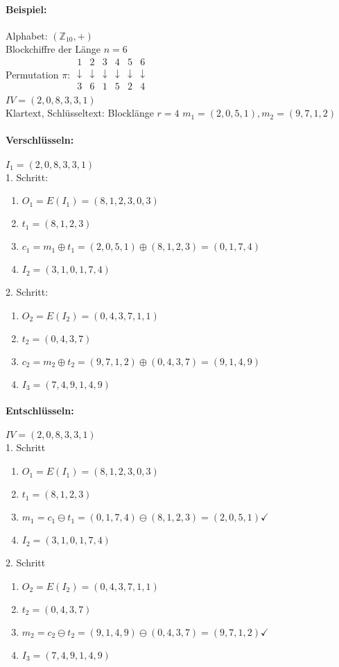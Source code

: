 \paragraph{Beispiel:} Alphabet: $(\mathbb{Z}_10,+)$\\
Blockchiffre der Länge $n = 6$\\
Permutation $\pi$: 
$\begin{array}{cccccc}
1 & 2 & 3 & 4 & 5 & 6\\ 
\downarrow & \downarrow & \downarrow & \downarrow & \downarrow & \downarrow \\ 
3 & 6 & 1 & 5 & 2 & 4\\
\end{array}$ 
\\
$IV=(2,0,8,3,3,1)$\\
Klartext, Schlüsseltext: Blocklänge $r=4$
$m_1=(2,0,5,1), m_2=(9,7,1,2)$

\paragraph{Verschlüsseln:} $I_1=(2,0,8,3,3,1)$\\
1. Schritt:\\
\begin{enumerate}
\item $O_1=E(I_1)=(8,1,2,3,0,3)$
\item $t_1=(8,1,2,3)$
\item $c_1=m_1 \oplus t_1 = (2,0,5,1) \oplus (8,1,2,3)=(0,1,7,4)$
\item $I_2=(3,1,0,1,7,4)$
\end{enumerate}
2. Schritt:\\
\begin{enumerate}
\item $O_2=E(I_2)=(0,4,3,7,1,1)$
\item $t_2=(0,4,3,7)$
\item $c_2=m_2 \oplus t_2 = (9,7,1,2) \oplus (0,4,3,7)=(9,1,4,9)$
\item $I_3=(7,4,9,1,4,9)$
\end{enumerate}

\paragraph{Entschlüsseln:}
$IV=(2,0,8,3,3,1)$\\
1. Schritt
\begin{enumerate}
\item $O_1 = E(I_1)=(8,1,2,3,0,3)$
\item $t_1 = (8,1,2,3)$
\item $m_1 = c_1 \ominus t_1 = (0,1,7,4) \ominus (8,1,2,3) = (2,0,5,1) \checkmark$
\item $I_2 = (3,1,0,1,7,4)$
\end{enumerate}
2. Schritt
\begin{enumerate}
\item $O_2 = E(I_2)=(0,4,3,7,1,1)$
\item $t_2 = (0,4,3,7)$
\item $m_2 = c_2 \ominus t_2 = (9,1,4,9) \ominus (0,4,3,7) = (9,7,1,2) \checkmark$
\item $I_3 = (7,4,9,1,4,9)$
\end{enumerate}

